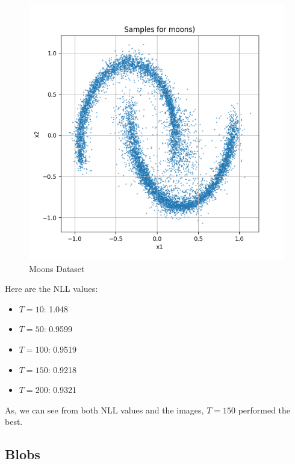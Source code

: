 \documentclass[a4paper,12pt]{article}
\begin{document}
\begin{figure}[H]
\begin{minipage}{0.3\textwidth}
  \end{minipage}
  \begin{minipage}{0.3\textwidth}
      \centering
      \includegraphics[width=\linewidth]{"images/Samples for ddpm_2_200_0.0001_0.02_moons.png"}
  \end{minipage}

  \caption{Moons Dataset}
\end{figure}

Here are the NLL values:
\begin{itemize}
  \item $T = 10$: 1.048
  \item $T = 50$: 0.9599
  \item $T = 100$: 0.9519
  \item $T = 150$: 0.9218
  \item $T = 200$: 0.9321
\end{itemize}

As, we can see from both NLL values and the images, $T = 150$ performed the best.

\clearpage



\subsection*{Blobs}
\end{document}
